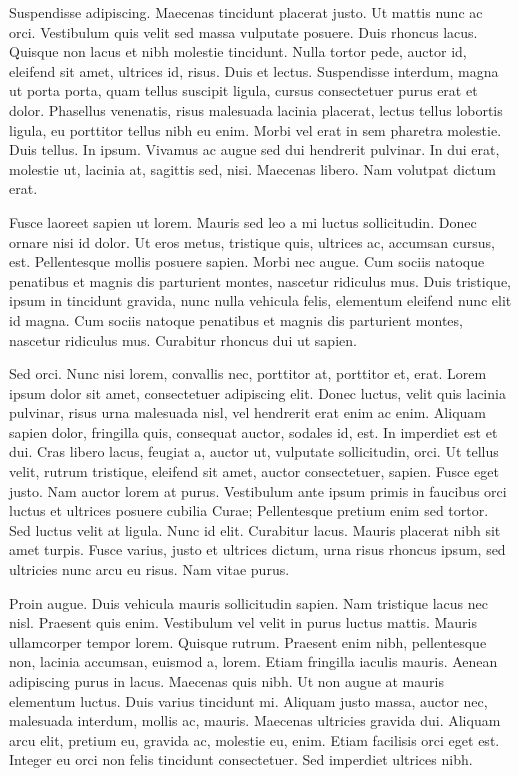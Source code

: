 Suspendisse adipiscing. Maecenas tincidunt placerat justo. Ut mattis nunc ac
orci. Vestibulum quis velit sed massa vulputate posuere. Duis rhoncus lacus.
Quisque non lacus et nibh molestie tincidunt. Nulla tortor pede, auctor id,
eleifend sit amet, ultrices id, risus. Duis et lectus. Suspendisse interdum,
magna ut porta porta, quam tellus suscipit ligula, cursus consectetuer purus
erat et dolor. Phasellus venenatis, risus malesuada lacinia placerat, lectus
tellus lobortis ligula, eu porttitor tellus nibh eu enim. Morbi vel erat in
sem pharetra molestie. Duis tellus. In ipsum. Vivamus ac augue sed dui
hendrerit pulvinar. In dui erat, molestie ut, lacinia at, sagittis sed, nisi.
Maecenas libero. Nam volutpat dictum erat.

Fusce laoreet sapien ut lorem. Mauris sed leo a mi luctus sollicitudin.
Donec ornare nisi id dolor. Ut eros metus, tristique quis, ultrices ac,
accumsan cursus, est. Pellentesque mollis posuere sapien. Morbi nec augue.
Cum sociis natoque penatibus et magnis dis parturient montes, nascetur
ridiculus mus. Duis tristique, ipsum in tincidunt gravida, nunc nulla
vehicula felis, elementum eleifend nunc elit id magna. Cum sociis natoque
penatibus et magnis dis parturient montes, nascetur ridiculus mus. Curabitur
rhoncus dui ut sapien.

Sed orci. Nunc nisi lorem, convallis nec, porttitor at, porttitor et, erat.
Lorem ipsum dolor sit amet, consectetuer adipiscing elit. Donec luctus, velit
quis lacinia pulvinar, risus urna malesuada nisl, vel hendrerit erat enim ac
enim. Aliquam sapien dolor, fringilla quis, consequat auctor, sodales id,
est. In imperdiet est et dui. Cras libero lacus, feugiat a, auctor ut,
vulputate sollicitudin, orci. Ut tellus velit, rutrum tristique, eleifend sit
amet, auctor consectetuer, sapien. Fusce eget justo. Nam auctor lorem at
purus. Vestibulum ante ipsum primis in faucibus orci luctus et ultrices
posuere cubilia Curae; Pellentesque pretium enim sed tortor. Sed luctus velit
at ligula. Nunc id elit. Curabitur lacus. Mauris placerat nibh sit amet
turpis. Fusce varius, justo et ultrices dictum, urna risus rhoncus ipsum, sed
ultricies nunc arcu eu risus. Nam vitae purus.

Proin augue. Duis vehicula mauris sollicitudin sapien. Nam tristique lacus
nec nisl. Praesent quis enim. Vestibulum vel velit in purus luctus mattis.
Mauris ullamcorper tempor lorem. Quisque rutrum. Praesent enim nibh,
pellentesque non, lacinia accumsan, euismod a, lorem. Etiam fringilla
iaculis mauris. Aenean adipiscing purus in lacus. Maecenas quis nibh. Ut
non augue at mauris elementum luctus. Duis varius tincidunt mi. Aliquam
justo massa, auctor nec, malesuada interdum, mollis ac, mauris. Maecenas
ultricies gravida dui. Aliquam arcu elit, pretium eu, gravida ac, molestie
eu, enim. Etiam facilisis orci eget est. Integer eu orci non felis tincidunt
consectetuer. Sed imperdiet ultrices nibh.
